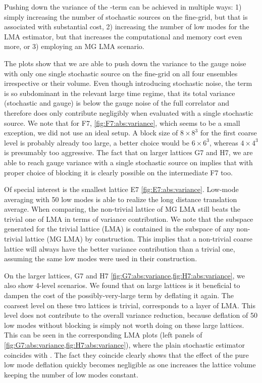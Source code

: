 Pushing down the variance of the -term can be achieved in multiple ways:
1) simply increasing the number of stochastic sources on the fine-grid, but that is associated with substantial cost,
2) increasing the number of low modes for the LMA estimator, but that increases the computational and memory cost even more,
or 3) employing an MG LMA scenario.

The plots show that we are able to push down the  variance to the gauge noise with only one single stochastic source on the fine-grid on all four ensembles irrespective or their volume.
Even though introducing stochastic noise, the  term is so subdominant in the relevant large time regime, that its total variance (stochastic and gauge) is below the gauge noise of the full correlator and therefore does only contribute negligibly when evaluated with a single stochastic source.
We note that for F7, \cref{fig:F7:abs:variance}, which seems to be a small exception, we did not use an ideal setup.
A block size of $8 \times 8^{3}$ for the first coarse level  is probably already too large, a better choice would be $6 \times 6^{3}$, whereas $4 \times 4^{3}$ is presumably too aggressive.
The fact that on larger lattices G7 and H7, we are able to reach gauge variance with a single stochastic source on  implies that with proper choice of blocking it is clearly possible on the intermediate F7 too.

Of special interest is the smallest lattice E7 \cref{fig:E7:abs:variance}.
Low-mode averaging with \num{50} low modes is able to realize the long distance translation average.
When comparing, the non-trivial lattice of MG LMA still beats the trivial one of LMA in terms of variance contribution.
We note that the subspace generated for the trivial lattice (LMA) is contained in the subspace of any non-trivial lattice (MG LMA) by construction.
This implies that a non-trivial coarse lattice will always have the better variance contribution than a trivial one, assuming the same low modes were used in their construction.

On the larger lattices, G7 and H7 \cref{fig:G7:abs:variance,fig:H7:abs:variance}, we also show 4-level scenarios.
We found that on large lattices is it beneficial to dampen the cost of the possibly-very-large  term by deflating it again.
The coarsest level on these two lattices is trivial, \ie corresponds to a layer of LMA.
This level does not contribute to the overall variance reduction, because deflation of \num{50} low modes without blocking is simply not worth doing on these large lattices.
This can be seen in the corresponding LMA plots (left panels of \cref{fig:G7:abs:variance,fig:H7:abs:variance}), where the plain stochastic estimator coincides with .
The fact they coincide clearly shows that the effect of the pure low mode deflation quickly becomes negligible as one increases the lattice volume keeping the number of low modes constant.

